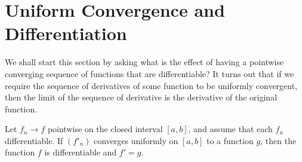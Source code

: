 \section{Uniform Convergence and Differentiation}

We shall start this section by asking what is the effect of having a pointwise converging sequence of functions that are differentiable? It turns out that if we require the sequence of derivatives of some function to be uniformly convergent, then the limit of the sequence of derivative is the derivative of the original function.

\begin{tcolorbox}
    \begin{thm}
        Let \( f_n \to f  \) pointwise on the closed interval \( [a,b] \), and assume that each \( f_n  \) differentiable. If \( (f'_n) \) converges uniformly on \( [a,b] \) to a function \( g  \), then the function \( f  \) is differentiable and \( f' = g  \).
    \end{thm}
\end{tcolorbox}

